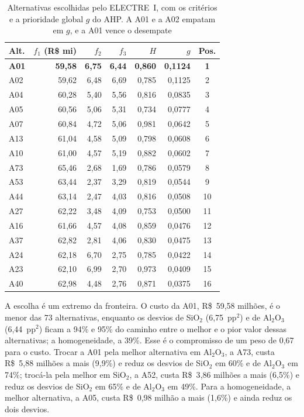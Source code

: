 \documentclass[conference]{IEEEtran}
\begin{document}
\begin{table}[htbp]
\caption{Alternativas escolhidas pelo ELECTRE~I, com os critérios e a prioridade global $g$ do AHP. A A01 e a A02 empatam em $g$, e a A01 vence o desempate}
\centering
\footnotesize
\begin{tabular}{l r r r r r c}
\toprule
\textbf{Alt.} & $f_1$ (R\$ mi) & $f_2$ & $f_3$ & $H$ & $g$ & \textbf{Pos.} \\
\midrule
\textbf{A01} & \textbf{59{,}58} & \textbf{6{,}75} & \textbf{6{,}44} & \textbf{0{,}860} & \textbf{0{,}1124} & \textbf{1} \\
A02 & 59{,}62 & 6{,}48 & 6{,}69 & 0{,}785 & 0{,}1125 & 2 \\
A04 & 60{,}28 & 5{,}40 & 5{,}56 & 0{,}816 & 0{,}0835 & 3 \\
A05 & 60{,}56 & 5{,}06 & 5{,}31 & 0{,}734 & 0{,}0777 & 4 \\
A07 & 60{,}84 & 4{,}72 & 5{,}06 & 0{,}981 & 0{,}0642 & 5 \\
A13 & 61{,}04 & 4{,}58 & 5{,}09 & 0{,}798 & 0{,}0608 & 6 \\
A10 & 61{,}00 & 4{,}57 & 5{,}19 & 0{,}882 & 0{,}0602 & 7 \\
A73 & 65{,}46 & 2{,}68 & 1{,}69 & 0{,}786 & 0{,}0579 & 8 \\
A53 & 63{,}44 & 2{,}37 & 3{,}29 & 0{,}819 & 0{,}0544 & 9 \\
A44 & 63{,}14 & 2{,}47 & 4{,}03 & 0{,}816 & 0{,}0508 & 10 \\
A27 & 62{,}22 & 3{,}48 & 4{,}09 & 0{,}753 & 0{,}0500 & 11 \\
A16 & 61{,}66 & 4{,}57 & 4{,}08 & 0{,}859 & 0{,}0476 & 12 \\
A37 & 62{,}82 & 2{,}81 & 4{,}06 & 0{,}830 & 0{,}0475 & 13 \\
A24 & 62{,}18 & 6{,}70 & 2{,}75 & 0{,}785 & 0{,}0422 & 14 \\
A23 & 62{,}10 & 6{,}99 & 2{,}70 & 0{,}973 & 0{,}0409 & 15 \\
A40 & 62{,}98 & 4{,}48 & 2{,}76 & 0{,}871 & 0{,}0375 & 16 \\
\bottomrule
\end{tabular}
\label{tab:nucleo}
\end{table}

A escolha é um extremo da fronteira. O custo da A01, R\$~59{,}58 milhões, é o menor das 73 alternativas, enquanto os desvios de SiO$_2$ (6{,}75~pp$^2$) e de Al$_2$O$_3$ (6{,}44~pp$^2$) ficam a 94\% e 95\% do caminho entre o melhor e o pior valor dessas alternativas; a homogeneidade, a 39\%. Esse é o compromisso de um peso de 0{,}67 para o custo. Trocar a A01 pela melhor alternativa em Al$_2$O$_3$, a A73, custa R\$~5{,}88 milhões a mais (9{,}9\%) e reduz os desvios de SiO$_2$ em 60\% e de Al$_2$O$_3$ em 74\%; trocá-la pela melhor em SiO$_2$, a A52, custa R\$~3{,}86 milhões a mais (6{,}5\%) e reduz os desvios de SiO$_2$ em 65\% e de Al$_2$O$_3$ em 49\%. Para a homogeneidade, a melhor alternativa, a A05, custa R\$~0{,}98 milhão a mais (1{,}6\%) e ainda reduz os dois desvios.
\end{document}
